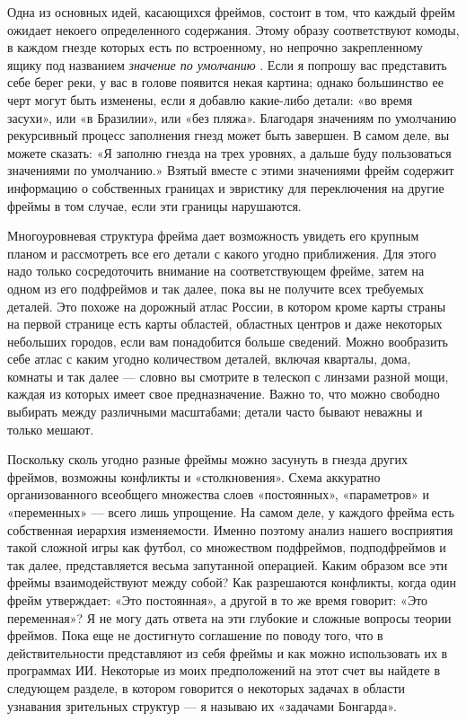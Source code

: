 \documentclass[../main.tex]{subfiles}
\begin{document}
Одна из основных идей, касающихся фреймов, состоит в том, что каждый фрейм ожидает некоего определенного содержания. Этому образу соответствуют комоды, в каждом гнезде которых есть по встроенному, но непрочно закрепленному ящику под названием \emph{значение по умолчанию} . Если я попрошу вас представить себе берег реки, у вас в голове появится некая картина; однако большинство ее черт могут быть изменены, если я добавлю какие-либо детали: «во время засухи», или «в Бразилии», или «без пляжа». Благодаря значениям по умолчанию рекурсивный процесс заполнения гнезд может быть завершен. В самом деле, вы можете сказать: «Я заполню гнезда на трех уровнях, а дальше буду пользоваться значениями по умолчанию.» Взятый вместе с этими значениями фрейм содержит информацию о собственных границах и эвристику для переключения на другие фреймы в том случае, если эти границы нарушаются.

Многоуровневая структура фрейма дает возможность увидеть его крупным планом и рассмотреть все его детали с какого угодно приближения. Для этого надо только сосредоточить внимание на соответствующем фрейме, затем на одном из его подфреймов и так далее, пока вы не получите всех требуемых деталей. Это похоже на дорожный атлас России, в котором кроме карты страны на первой странице есть карты областей, областных центров и даже некоторых небольших городов, если вам понадобится больше сведений. Можно вообразить себе атлас с каким угодно количеством деталей, включая кварталы, дома, комнаты и так далее --- словно вы смотрите в телескоп с линзами разной мощи, каждая из которых имеет свое предназначение. Важно то, что можно свободно выбирать между различными масштабами; детали часто бывают неважны и только мешают.

Поскольку сколь угодно разные фреймы можно засунуть в гнезда других фреймов, возможны конфликты и «столкновения». Схема аккуратно организованного всеобщего множества слоев «постоянных», «параметров» и «переменных» --- всего лишь упрощение. На самом деле, у каждого фрейма есть собственная иерархия изменяемости. Именно поэтому анализ нашего восприятия такой сложной игры как футбол, со множеством подфреймов, подподфреймов и так далее, представляется весьма запутанной операцией. Каким образом все эти фреймы взаимодействуют между собой? Как разрешаются конфликты, когда один фрейм утверждает: «Это постоянная», а другой в то же время говорит: «Это переменная»? Я не могу дать ответа на эти глубокие и сложные вопросы теории фреймов. Пока еще не достигнуто соглашение по поводу того, что в действительности представляют из себя фреймы и как можно использовать их в программах ИИ. Некоторые из моих предположений на этот счет вы найдете в следующем разделе, в котором говорится о некоторых задачах в области узнавания зрительных структур --- я называю их «задачами Бонгарда».
\end{document}
